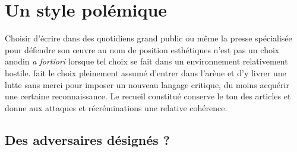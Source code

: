 \documentclass[12pt, a4paper]{article}
\begin{document}
	
%		
%		
%		
%		
	
	
	
	

\newpage

\section{Un style polémique}

Choisir d'écrire dans des quotidiens grand public ou même la presse spécialisée pour défendre son œuvre au nom de position esthétiques n'est pas un choix anodin \textit{a fortiori} lorsque tel choix se fait dans un environnement relativement hostile. \robbe{} fait le choix pleinement assumé d'entrer dans l'arène et d'y livrer une lutte sans merci pour imposer un nouveau langage critique, du moins acquérir une certaine reconnaissance. Le recueil constitué conserve le ton des articles et donne aux attaques et récréminations une relative cohérence.

\subsection{Des adversaires désignés ?}

\end{document}
